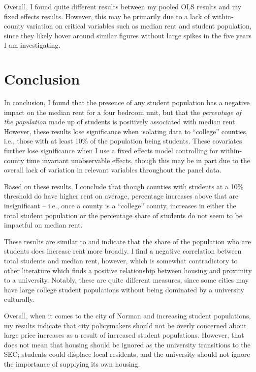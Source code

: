 \documentclass[12pt,english]{article}
\begin{document}
Overall, I found quite different results between my pooled OLS results and my fixed effects results. However, this may be primarily due to a lack of within-county variation on critical variables such as median rent and student population, since they likely hover around similar figures without large spikes in the five years I am investigating. 


\section{Conclusion}\label{sec:conclusion}

In conclusion, I found that the presence of any student population has a negative impact on the median rent for a four bedroom unit, but that the \textit{percentage of the population} made up of students is positively associated with median rent. However, these results lose significance when isolating data to ``college'' counties, i.e., those with at least 10\% of the population being students. These covariates further lose significance when I use a fixed effects model controlling for within-county time invariant unobservable effects, though this may be in part due to the overall lack of variation in relevant variables throughout the panel data. 

Based on these results, I conclude that though counties with students at a 10\% threshold do have higher rent on average, percentage increases above that are insignificant -- i.e., once a county is a ``college'' county, increases in either the total student population or the percentage share of students do not seem to be impactful on median rent. 

These results are similar to \citet{Ogur1973} and indicate that the share of the population who are students does increase rent more broadly. I find a negative correlation between total students and median rent, however, which is somewhat contradictory to other literature which finds a positive relationship between housing and proximity to a university. Notably, these are quite different measures, since some cities may have large college student populations without being dominated by a university culturally. 

Overall, when it comes to the city of Norman and increasing student populations, my results indicate that city policymakers should not be overly concerned about large price increases as a result of increased student populations. However, that does not mean that housing should be ignored as the university transitions to the SEC; students could displace local residents, and the university should not ignore the importance of supplying its own housing. 
\end{document}
